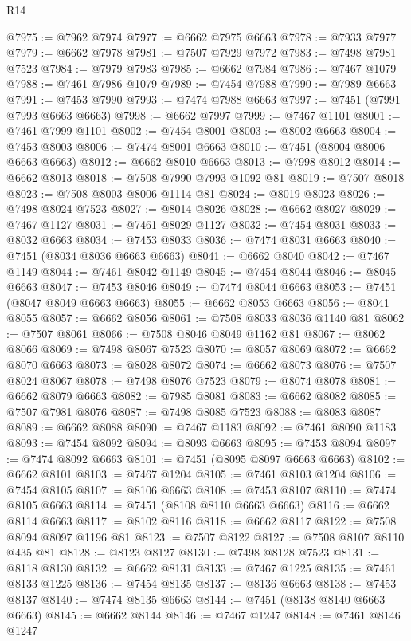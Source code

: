 \begin{lexlean}{R14}
\begin{coremodule}
{{{{{{{{{{{{{{{{{{{{{{{{{{{{{{{{{{{{{{{{{{{{{{{{{{{{{{{{{{{{{{{{{{{{{{{{{{{{{{{{{{@7975 := @7962 @7974
@7977 := @6662 @7975 @6663
@7978 := @7933 @7977
@7979 := @6662 @7978
@7981 := @7507 @7929 @7972
@7983 := @7498 @7981 @7523
@7984 := @7979 @7983
@7985 := @6662 @7984
@7986 := @7467 @1079
@7988 := @7461 @7986 @1079
@7989 := @7454 @7988
@7990 := @7989 @6663
@7991 := @7453 @7990
@7993 := @7474 @7988 @6663
@7997 := @7451 (@7991 @7993 @6663 @6663)
@7998 := @6662 @7997
@7999 := @7467 @1101
@8001 := @7461 @7999 @1101
@8002 := @7454 @8001
@8003 := @8002 @6663
@8004 := @7453 @8003
@8006 := @7474 @8001 @6663
@8010 := @7451 (@8004 @8006 @6663 @6663)
@8012 := @6662 @8010 @6663
@8013 := @7998 @8012
@8014 := @6662 @8013
@8018 := @7508 @7990 @7993 @1092 @81
@8019 := @7507 @8018
@8023 := @7508 @8003 @8006 @1114 @81
@8024 := @8019 @8023
@8026 := @7498 @8024 @7523
@8027 := @8014 @8026
@8028 := @6662 @8027
@8029 := @7467 @1127
@8031 := @7461 @8029 @1127
@8032 := @7454 @8031
@8033 := @8032 @6663
@8034 := @7453 @8033
@8036 := @7474 @8031 @6663
@8040 := @7451 (@8034 @8036 @6663 @6663)
@8041 := @6662 @8040
@8042 := @7467 @1149
@8044 := @7461 @8042 @1149
@8045 := @7454 @8044
@8046 := @8045 @6663
@8047 := @7453 @8046
@8049 := @7474 @8044 @6663
@8053 := @7451 (@8047 @8049 @6663 @6663)
@8055 := @6662 @8053 @6663
@8056 := @8041 @8055
@8057 := @6662 @8056
@8061 := @7508 @8033 @8036 @1140 @81
@8062 := @7507 @8061
@8066 := @7508 @8046 @8049 @1162 @81
@8067 := @8062 @8066
@8069 := @7498 @8067 @7523
@8070 := @8057 @8069
@8072 := @6662 @8070 @6663
@8073 := @8028 @8072
@8074 := @6662 @8073
@8076 := @7507 @8024 @8067
@8078 := @7498 @8076 @7523
@8079 := @8074 @8078
@8081 := @6662 @8079 @6663
@8082 := @7985 @8081
@8083 := @6662 @8082
@8085 := @7507 @7981 @8076
@8087 := @7498 @8085 @7523
@8088 := @8083 @8087
@8089 := @6662 @8088
@8090 := @7467 @1183
@8092 := @7461 @8090 @1183
@8093 := @7454 @8092
@8094 := @8093 @6663
@8095 := @7453 @8094
@8097 := @7474 @8092 @6663
@8101 := @7451 (@8095 @8097 @6663 @6663)
@8102 := @6662 @8101
@8103 := @7467 @1204
@8105 := @7461 @8103 @1204
@8106 := @7454 @8105
@8107 := @8106 @6663
@8108 := @7453 @8107
@8110 := @7474 @8105 @6663
@8114 := @7451 (@8108 @8110 @6663 @6663)
@8116 := @6662 @8114 @6663
@8117 := @8102 @8116
@8118 := @6662 @8117
@8122 := @7508 @8094 @8097 @1196 @81
@8123 := @7507 @8122
@8127 := @7508 @8107 @8110 @435 @81
@8128 := @8123 @8127
@8130 := @7498 @8128 @7523
@8131 := @8118 @8130
@8132 := @6662 @8131
@8133 := @7467 @1225
@8135 := @7461 @8133 @1225
@8136 := @7454 @8135
@8137 := @8136 @6663
@8138 := @7453 @8137
@8140 := @7474 @8135 @6663
@8144 := @7451 (@8138 @8140 @6663 @6663)
@8145 := @6662 @8144
@8146 := @7467 @1247
@8148 := @7461 @8146 @1247
}}}}}}}}}}}}}}}}}}}}}}}}}}}}}}}}}}}}}}}}}}}}}}}}}}}}}}}}}}}}}}}}}}}}}}}}}}}}}}}}}}
\end{coremodule}
\end{lexlean}
